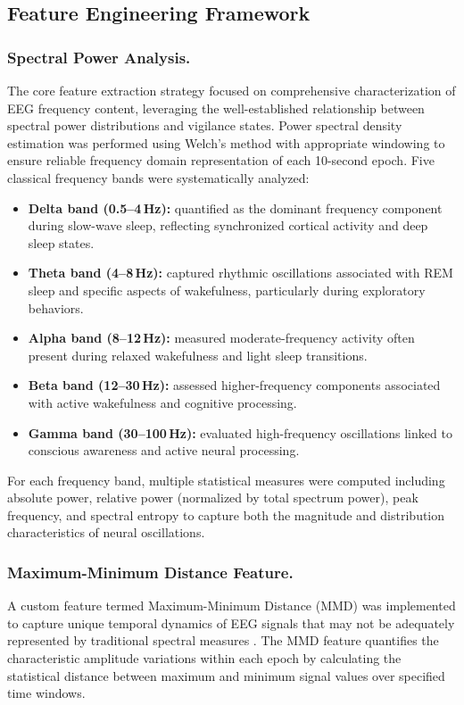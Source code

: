 \documentclass[letterpaper]{article} %
\begin{document}
\subsection{Feature Engineering Framework}

\subsubsection{Spectral Power Analysis.}
The core feature extraction strategy focused on comprehensive characterization of EEG frequency content, leveraging the well-established relationship between spectral power distributions and vigilance states. Power spectral density estimation was performed using Welch's method with appropriate windowing to ensure reliable frequency domain representation of each 10-second epoch. Five classical frequency bands were systematically analyzed:

\begin{itemize}\itemsep2pt\parskip0pt
    \item \textbf{Delta band (0.5--4\,Hz):} quantified as the dominant frequency component during slow-wave sleep, reflecting synchronized cortical activity and deep sleep states.
    \item \textbf{Theta band (4--8\,Hz):} captured rhythmic oscillations associated with REM sleep and specific aspects of wakefulness, particularly during exploratory behaviors.
    \item \textbf{Alpha band (8--12\,Hz):} measured moderate-frequency activity often present during relaxed wakefulness and light sleep transitions.
    \item \textbf{Beta band (12--30\,Hz):} assessed higher-frequency components associated with active wakefulness and cognitive processing.
    \item \textbf{Gamma band (30--100\,Hz):} evaluated high-frequency oscillations linked to conscious awareness and active neural processing.
\end{itemize}

For each frequency band, multiple statistical measures were computed including absolute power, relative power (normalized by total spectrum power), peak frequency, and spectral entropy to capture both the magnitude and distribution characteristics of neural oscillations.

\subsubsection{Maximum-Minimum Distance Feature.}
A custom feature termed Maximum-Minimum Distance (MMD) was implemented to capture unique temporal dynamics of EEG signals that may not be adequately represented by traditional spectral measures \citep{e18090272}. The MMD feature quantifies the characteristic amplitude variations within each epoch by calculating the statistical distance between maximum and minimum signal values over specified time windows.
\end{document}
